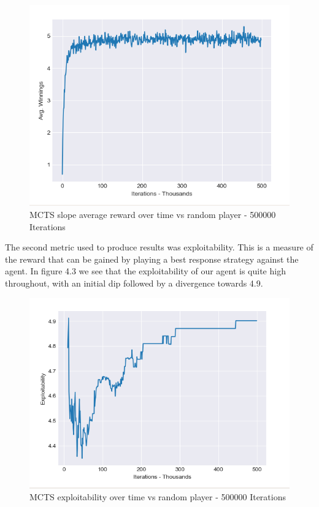 \begin{figure}[ht]
    \includegraphics[scale=.7]{images/avg_reward_500000__20_random.png}
    \caption{MCTS slope average reward over time vs random player - 500000 Iterations}
\end{figure}

The second metric used to produce results was exploitability.
This is a measure of the reward that can be gained by playing a best response strategy
against the agent.
In figure 4.3 we see that the exploitability of our agent is quite high throughout, with an
initial dip followed by a divergence towards 4.9.

\begin{figure}[ht]
    \includegraphics[scale=.7]{images/exploitability_500000_20_random.png}
    \caption{MCTS exploitability over time vs random player - 500000 Iterations}
\end{figure}


